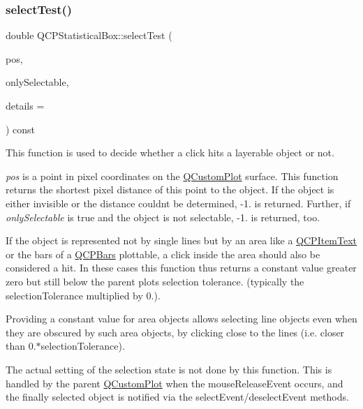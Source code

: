 \subsubsection{\texorpdfstring{select\+Test()}{selectTest()}}
{\footnotesize\ttfamily double Q\+C\+P\+Statistical\+Box\+::select\+Test (\begin{DoxyParamCaption}\item[{const Q\+PointF \&}]{pos,  }\item[{bool}]{only\+Selectable,  }\item[{Q\+Variant $\ast$}]{details = {} }\end{DoxyParamCaption}) const\hspace{0.3cm}{\ttfamily [virtual]}}

This function is used to decide whether a click hits a layerable object or not.

{\itshape pos} is a point in pixel coordinates on the \hyperlink{class_q_custom_plot}{Q\+Custom\+Plot} surface. This function returns the shortest pixel distance of this point to the object. If the object is either invisible or the distance couldn\textquotesingle{}t be determined, -\/1. is returned. Further, if {\itshape only\+Selectable} is true and the object is not selectable, -\/1. is returned, too.

If the object is represented not by single lines but by an area like a \hyperlink{class_q_c_p_item_text}{Q\+C\+P\+Item\+Text} or the bars of a \hyperlink{class_q_c_p_bars}{Q\+C\+P\+Bars} plottable, a click inside the area should also be considered a hit. In these cases this function thus returns a constant value greater zero but still below the parent plot\textquotesingle{}s selection tolerance. (typically the selection\+Tolerance multiplied by 0.).

Providing a constant value for area objects allows selecting line objects even when they are obscured by such area objects, by clicking close to the lines (i.\+e. closer than 0.$\ast$selection\+Tolerance).

The actual setting of the selection state is not done by this function. This is handled by the parent \hyperlink{class_q_custom_plot}{Q\+Custom\+Plot} when the mouse\+Release\+Event occurs, and the finally selected object is notified via the select\+Event/deselect\+Event methods.

